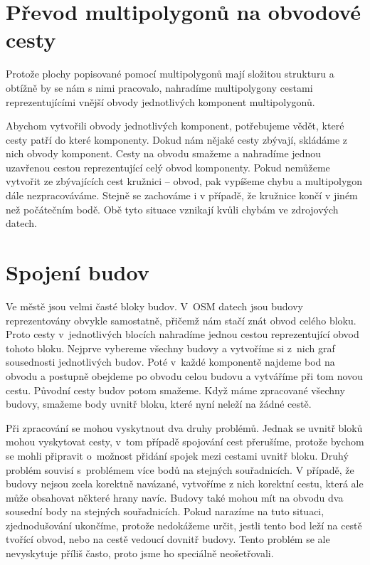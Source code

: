 \section{Převod multipolygonů na obvodové cesty}
Protože plochy popisované pomocí multipolygonů mají složitou strukturu a obtížně
by se nám s nimi pracovalo, nahradíme multipolygony cestami reprezentujícími
vnější obvody jednotlivých komponent multipolygonů.

Abychom vytvořili obvody jednotlivých komponent, potřebujeme vědět, které cesty
patří do které komponenty.  Dokud nám nějaké cesty zbývají, skládáme z nich
obvody komponent. Cesty na obvodu smažeme a nahradíme jednou uzavřenou cestou
reprezentující celý obvod komponenty. Pokud nemůžeme vytvořit ze zbývajících
cest kružnici -- obvod, pak vypíšeme chybu a multipolygon dále nezpracováváme.
Stejně se zachováme i v případě, že kružnice končí v jiném než počátečním bodě.
Obě tyto situace vznikají kvůli chybám ve zdrojových datech.

\section{Spojení budov}
Ve městě jsou velmi časté bloky budov. V~OSM datech jsou budovy reprezentovány
obvykle samostatně, přičemž nám stačí znát obvod celého bloku. Proto cesty
v~jednotlivých blocích nahradíme jednou cestou reprezentující obvod tohoto bloku.
Nejprve vybereme všechny budovy a vytvoříme si z~nich graf sousednosti
jednotlivých budov. Poté v~každé komponentě najdeme bod na obvodu a postupně
obejdeme po obvodu celou budovu a vytváříme při tom novou cestu. Původní
cesty budov potom smažeme. Když máme zpracované všechny budovy, smažeme body uvnitř
bloku, které nyní neleží na žádné cestě.

Při zpracování se mohou vyskytnout dva druhy problémů. Jednak se uvnitř bloků
mohou vyskytovat cesty, v~tom případě spojování cest přerušíme, protože bychom
se mohli připravit o~možnost přidání spojek mezi cestami uvnitř bloku. Druhý
problém souvisí s~problémem více bodů na stejných souřadnicích. V případě, že
budovy nejsou zcela korektně navázané, vytvoříme z nich korektní cestu, která
ale může obsahovat některé hrany navíc. Budovy také mohou mít na obvodu dva sousední body
na stejných souřadnicích. Pokud narazíme na tuto situaci, zjednodušování
ukončíme, protože nedokážeme určit, jestli tento bod leží na cestě tvořící
obvod, nebo na cestě vedoucí dovnitř budovy. Tento problém se ale nevyskytuje
příliš často, proto jsme ho speciálně neošetřovali.

